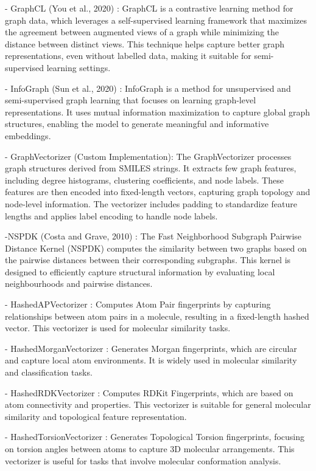 - GraphCL (You et al., 2020) \cite{you2020graph}: GraphCL is a contrastive learning method for graph data, which leverages a self-supervised learning framework that maximizes the agreement between augmented views of a graph while minimizing the distance between distinct views. This technique helps capture better graph representations, even without labelled data, making it suitable for semi-supervised learning settings.

- InfoGraph (Sun et al., 2020) \cite{sun2019infograph}: InfoGraph is a method for unsupervised and semi-supervised graph learning that focuses on learning graph-level representations. It uses mutual information maximization to capture global graph structures, enabling the model to generate meaningful and informative embeddings. 

- GraphVectorizer (Custom Implementation): The GraphVectorizer processes graph structures derived from SMILES strings. It extracts few graph features, including degree histograms, clustering coefficients, and node labels. These features are then encoded into fixed-length vectors, capturing graph topology and node-level information. The vectorizer includes padding to standardize feature lengths and applies label encoding to handle node labels.

-NSPDK (Costa and Grave, 2010) \cite{costa2010fast}: The Fast Neighborhood Subgraph Pairwise Distance Kernel (NSPDK) computes the similarity between two graphs based on the pairwise distances between their corresponding subgraphs. This kernel is designed to efficiently capture structural information by evaluating local neighbourhoods and pairwise distances.

- HashedAPVectorizer \cite{rdkit2011}: Computes Atom Pair fingerprints by capturing relationships between atom pairs in a molecule, resulting in a fixed-length hashed vector. This vectorizer is used for molecular similarity tasks.

- HashedMorganVectorizer \cite{rdkit2011}: Generates Morgan fingerprints, which are circular and capture local atom environments. It is widely used in molecular similarity and classification tasks.

- HashedRDKVectorizer \cite{rdkit2011}: Computes RDKit Fingerprints, which are based on atom connectivity and properties. This vectorizer is suitable for general molecular similarity and topological feature representation.

- HashedTorsionVectorizer \cite{rdkit2011}: Generates Topological Torsion fingerprints, focusing on torsion angles between atoms to capture 3D molecular arrangements. This vectorizer is useful for tasks that involve molecular conformation analysis.

